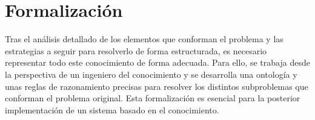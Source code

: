 
\section{Formalización} \label{sec:formalizacion}

Tras el análisis detallado de los elementos que conforman el problema y las 
estrategias a seguir para resolverlo de forma estructurada, es necesario 
representar todo este conocimiento de forma adecuada. Para ello, se trabaja 
desde la perspectiva de un ingeniero del conocimiento y se desarrolla una 
ontología y unas reglas de razonamiento precisas para resolver los distintos 
subproblemas que conforman el problema original. Esta formalización es 
esencial para la posterior implementación de un sistema basado en el 
conocimiento.





\clearpage


